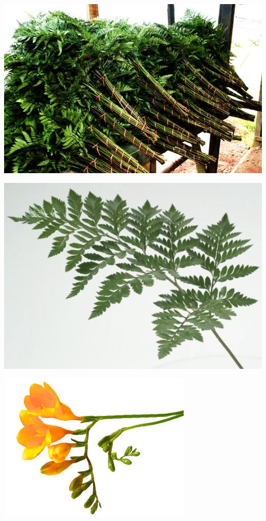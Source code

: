 \documentclass{article}
\begin{document}
\begin{center}
\includegraphics[height=0.925\paperheight]{../Fern_LeatherLeaf_Bunches.jpg}
\end{center}
\newpage

\begin{center}
\includegraphics[height=0.925\paperheight]{../Fern_LeatherLeaf_Leaf.jpg}
\end{center}
\newpage

\begin{center}
\includegraphics[height=0.925\paperheight]{../Freesia.jpg}
\end{center}
\newpage
\end{document}
